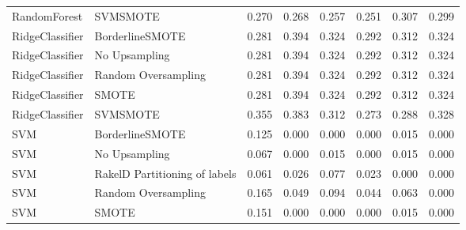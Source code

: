 \begin{tabular}{llllllll}
                   RandomForest &                      SVMSMOTE & 0.270 &                     0.268 &                 0.257 &                  0.251 &                                   0.307 &     0.299 \\
                RidgeClassifier &               BorderlineSMOTE & 0.281 &                     0.394 &                 0.324 &                  0.292 &                                   0.312 &     0.324 \\
                RidgeClassifier &                 No Upsampling & 0.281 &                     0.394 &                 0.324 &                  0.292 &                                   0.312 &     0.324 \\
                RidgeClassifier &           Random Oversampling & 0.281 &                     0.394 &                 0.324 &                  0.292 &                                   0.312 &     0.324 \\
                RidgeClassifier &                         SMOTE & 0.281 &                     0.394 &                 0.324 &                  0.292 &                                   0.312 &     0.324 \\
                RidgeClassifier &                      SVMSMOTE & 0.355 &                     0.383 &                 0.312 &                  0.273 &                                   0.288 &     0.328 \\
                            SVM &               BorderlineSMOTE & 0.125 &                     0.000 &                 0.000 &                  0.000 &                                   0.015 &     0.000 \\
                            SVM &                 No Upsampling & 0.067 &                     0.000 &                 0.015 &                  0.000 &                                   0.015 &     0.000 \\
                            SVM & RakelD Partitioning of labels & 0.061 &                     0.026 &                 0.077 &                  0.023 &                                   0.000 &     0.000 \\
                            SVM &           Random Oversampling & 0.165 &                     0.049 &                 0.094 &                  0.044 &                                   0.063 &     0.000 \\
                            SVM &                         SMOTE & 0.151 &                     0.000 &                 0.000 &                  0.000 &                                   0.015 &     0.000 \\

\end{tabular}
